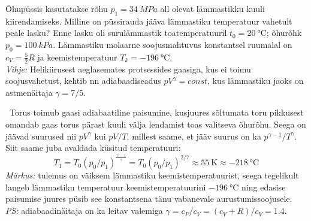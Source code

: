 
Õhupüssis kasutatakse rõhu $p_1=\SI{34}{MPa}$ all olevat lämmastikku kuuli kiirendamiseks. Milline on püssirauda jääva lämmastiku temperatuur vahetult peale lasku? Enne lasku oli surulämmastik toatemperatuuril $t_0=\SI{20}\celsius$; õhurõhk $p_0=\SI{100}{kPa}$. Lämmastiku molaarne soojusmahtuvus konstantsel ruumalal on $c_V=\frac 52R$ ja keemistemperatuur $T_k=\SI{-196}\celsius$. \\
\textit{Vihje:} Helikiirusest aeglasemates protsessides gaasiga, kus ei toimu soojusvahetust, kehtib nn adiabaadiseadus $pV^\gamma=const$, kus lämmastiku jaoks on astmenäitaja $\gamma=7/5$. 


\hint

\solu
\
Torus toimub gaasi adiabaatiline paisumine, kusjuures sõltumata toru pikkusest omandab gaas torus pärast kuuli välja lendamist toas valitseva õhurõhu. Seega on jäävad suurused nii $pV^\gamma$ kui $pV/T$, millest saame, et jääv suurus on ka $p^{\gamma-1}/T^\gamma$. Siit saame juba avaldada küsitud temperatuuri:
$$
T_1=T_0(p_0/p_1)^{\frac{\gamma - 1}{\gamma}}=T_0(p_0/p_1)^{2/7} \approx \SI{55}{\kelvin} \approx \SI{-218}{\celsius}
$$
\textit{Märkus:} tulemus on väiksem lämmastiku keemistemperatuurist, seega tegelikult langeb lämmastiku temperatuur keemistemperatuurini $\SI{-196}{\celsius}$ ning edasise paisumise juures püsib see konstantsena tänu vabanevale aurustumissoojusele.
\textit{PS:} adiabaadinäitaja on ka leitav valemiga $\gamma=c_P/c_V=(c_V+R)/c_V=1.4$.
\probend